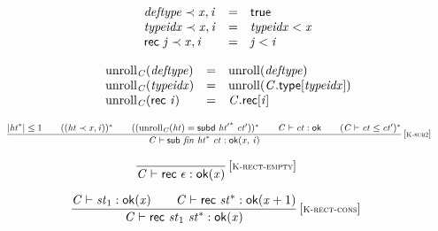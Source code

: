 $$
\begin{array}{@{}lcl@{}l@{}}
{\mathit{deftype}} \prec {\mathit{x}}, {\mathit{i}} &=& \mathsf{true} &  \\
{\mathit{typeidx}} \prec {\mathit{x}}, {\mathit{i}} &=& {\mathit{typeidx}} < {\mathit{x}} &  \\
\mathsf{rec}~{\mathit{j}} \prec {\mathit{x}}, {\mathit{i}} &=& {\mathit{j}} < {\mathit{i}} &  \\
\end{array}
$$

$$
\begin{array}{@{}lcl@{}l@{}}
{{\mathrm{unroll}}}_{{\mathit{C}}}({\mathit{deftype}}) &=& {\mathrm{unroll}}({\mathit{deftype}}) &  \\
{{\mathrm{unroll}}}_{{\mathit{C}}}({\mathit{typeidx}}) &=& {\mathrm{unroll}}({\mathit{C}}.\mathsf{type}[{\mathit{typeidx}}]) &  \\
{{\mathrm{unroll}}}_{{\mathit{C}}}(\mathsf{rec}~{\mathit{i}}) &=& {\mathit{C}}.\mathsf{rec}[{\mathit{i}}] &  \\
\end{array}
$$

$$
\begin{array}{@{}c@{}}\displaystyle
\frac{
{|{{\mathit{ht}}^\ast}|} \leq 1
 \qquad
(({\mathit{ht}} \prec {\mathit{x}}, {\mathit{i}}))^\ast
 \qquad
(({{\mathrm{unroll}}}_{{\mathit{C}}}({\mathit{ht}}) = \mathsf{subd}~{{\mathit{ht}'}^\ast}~{\mathit{ct}'}))^\ast
 \qquad
{\mathit{C}} \vdash {\mathit{ct}} : \mathsf{ok}
 \qquad
({\mathit{C}} \vdash {\mathit{ct}} \leq {\mathit{ct}'})^\ast
}{
{\mathit{C}} \vdash \mathsf{sub}~{\mathit{fin}}~{{\mathit{ht}}^\ast}~{\mathit{ct}} : {\mathsf{ok}}{({\mathit{x}},\, {\mathit{i}})}
} \, {[\textsc{\scriptsize K{-}sub2}]}
\qquad
\end{array}
$$

\vspace{1ex}

$$
\begin{array}{@{}c@{}}\displaystyle
\frac{
}{
{\mathit{C}} \vdash \mathsf{rec}~\epsilon : {\mathsf{ok}}{({\mathit{x}})}
} \, {[\textsc{\scriptsize K{-}rect{-}empty}]}
\qquad
\end{array}
$$

$$
\begin{array}{@{}c@{}}\displaystyle
\frac{
{\mathit{C}} \vdash {\mathit{st}}_{{1}} : {\mathsf{ok}}{({\mathit{x}})}
 \qquad
{\mathit{C}} \vdash \mathsf{rec}~{{\mathit{st}}^\ast} : {\mathsf{ok}}{({\mathit{x}} + 1)}
}{
{\mathit{C}} \vdash \mathsf{rec}~{\mathit{st}}_{{1}}~{{\mathit{st}}^\ast} : {\mathsf{ok}}{({\mathit{x}})}
} \, {[\textsc{\scriptsize K{-}rect{-}cons}]}
\qquad
\end{array}
$$

